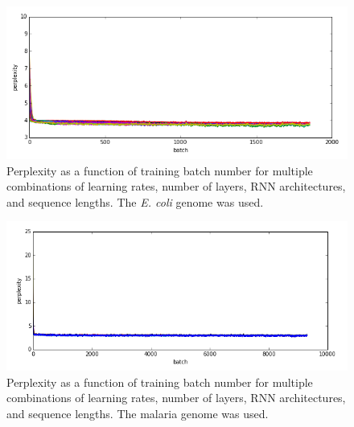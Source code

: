 \documentclass{article} %
\begin{document}
\begin{figure}[!htb]
	\caption{Perplexity as a function of training batch number for multiple combinations of learning rates, number of layers, RNN architectures, and sequence lengths. The \textit{E. coli} genome was used.}
	\centering
	\includegraphics[scale=0.6]{tlecoli}
\end{figure}
\begin{figure}[!htb]
	\caption{Perplexity as a function of training batch number for multiple combinations of learning rates, number of layers, RNN architectures, and sequence lengths. The malaria genome was used.}
	\centering
	\includegraphics[scale=0.6]{tlmalaria}
\end{figure}
 


\end{document}
